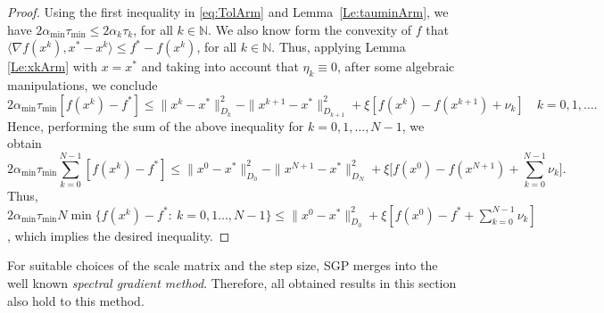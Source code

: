 \begin{proof}
	Using the first inequality in \eqref{eq:TolArm} and Lemma~\ref{Le:tauminArm}, we have $2 \alpha_{\min} \tau_{\min} \leq 2 \alpha_k \tau_k$, for all $k\in {\mathbb N}$. We also know form the convexity of $f$ that $\langle \nabla f(x^k), x^*-x^k \rangle \leq f^* - f(x^k)$, for all $k\in {\mathbb N}$. Thus, applying Lemma \ref{Le:xkArm} with $x=x^*$ {and taking into account that $\eta_k\equiv 0$},  after some algebraic manipulations, we conclude
	$$
		2 \alpha_{\min} \tau_{\min} \left[f(x^k)-f^*\right] \leq \|x^k-x^*\|_{D_k}^2-\|x^{k+1}-x^*\|_{D_{k+1}}^2 + \xi \left[f(x^k) - f(x^{k+1})+\nu_k \right] \quad k = 0, 1, \ldots.
	$$
	Hence, performing the sum of the above inequality for $k = 0,1,\ldots, N-1$, we obtain
	$$
		2 \alpha_{\min} \tau_{\min}\sum_{k=0}^{N-1} \left[f(x^k)-f^*\right] \leq \|x^0-x^*\|_{D_0}^2-\|x^{N+1}-x^*\|_{D_{N}}^2 + \xi\Big[f(x^0)-f(x^{N+1})+ \sum_{k=0}^{N-1} \nu_k\Big].
	$$
	Thus, $2\alpha_{\min} \tau_{\min} N \min\{f(x^k) - f^*:~ k = 0, 1 \ldots, N-1\} \leq \|x^0 - x^*\|^2_{D_0}+ \xi[f(x^0)-f^*+ \sum_{k=0}^{N-1} \nu_k]$, which implies the desired inequality.
\end{proof}
\begin{remark}\normalfont
	For suitable choices  of the scale matrix  and the step size,  SGP merges into the well known {\it spectral gradient method}. Therefore, all obtained results in this section  also hold to this method.
\end{remark}\normalfont